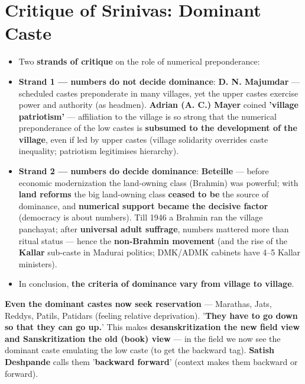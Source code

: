 \section{Critique of Srinivas: Dominant Caste}

\begin{CriticalPoint}
\begin{itemize}
\item Two \textbf{strands of critique} on the role of numerical preponderance:
\item \textbf{Strand 1 --- numbers do not decide dominance}: \textbf{D. N. Majumdar} --- scheduled castes preponderate in many villages, yet the upper castes exercise power and authority (as headmen). \textbf{Adrian (A. C.) Mayer} coined \textbf{'village patriotism'} --- affiliation to the village is so strong that the numerical preponderance of the low castes is \textbf{subsumed to the development of the village}, even if led by upper castes (village solidarity overrides caste inequality; patriotism legitimises hierarchy).
\item \textbf{Strand 2 --- numbers do decide dominance}: \textbf{Beteille} --- before economic modernization the land-owning class (Brahmin) was powerful; with \textbf{land reforms} the big land-owning class \textbf{ceased to be} the source of dominance, and \textbf{numerical support became the decisive factor} (democracy is about numbers). Till 1946 a Brahmin ran the village panchayat; after \textbf{universal adult suffrage}, numbers mattered more than ritual status --- hence the \textbf{non-Brahmin movement} (and the rise of the \textbf{Kallar} sub-caste in Madurai politics; DMK/ADMK cabinets have 4--5 Kallar ministers).
\item In conclusion, \textbf{the criteria of dominance vary from village to village}.
\end{itemize}
\end{CriticalPoint}

\begin{CriticalPoint}
\textbf{Even the dominant castes now seek reservation} --- Marathas, Jats, Reddys, Patils, Patidars (feeling relative deprivation). '\textbf{They have to go down so that they can go up.}' This makes \textbf{desanskritization the new field view and Sanskritization the old (book) view} --- in the field we now see the dominant caste emulating the low caste (to get the backward tag). \textbf{Satish Deshpande} calls them '\textbf{backward forward}' (context makes them backward or forward).
\end{CriticalPoint}

